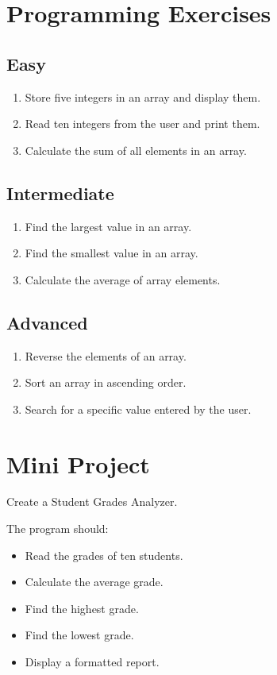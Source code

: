 \documentclass[12pt,openany]{book}
\begin{document}
\section{Programming Exercises}

\subsection*{Easy}

\begin{enumerate}
    \item Store five integers in an array and display them.
    \item Read ten integers from the user and print them.
    \item Calculate the sum of all elements in an array.
\end{enumerate}

\subsection*{Intermediate}

\begin{enumerate}
    \item Find the largest value in an array.
    \item Find the smallest value in an array.
    \item Calculate the average of array elements.
\end{enumerate}

\subsection*{Advanced}

\begin{enumerate}
    \item Reverse the elements of an array.
    \item Sort an array in ascending order.
    \item Search for a specific value entered by the user.
\end{enumerate}

\section{Mini Project}

Create a Student Grades Analyzer.

The program should:

\begin{itemize}
    \item Read the grades of ten students.
    \item Calculate the average grade.
    \item Find the highest grade.
    \item Find the lowest grade.
    \item Display a formatted report.
\end{itemize}
\end{document}

